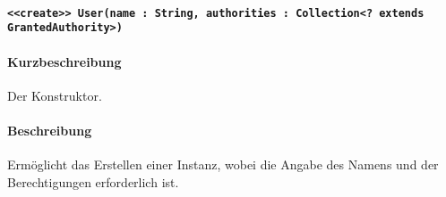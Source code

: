 \paragraph{\texttt{<<create>> User(name : String, authorities : Collection<? extends GrantedAuthority>)}}%
\paragraph*{Kurzbeschreibung}
Der Konstruktor.
\paragraph*{Beschreibung}
Ermöglicht das Erstellen einer Instanz, wobei die Angabe des Namens und der Berechtigungen erforderlich ist.
